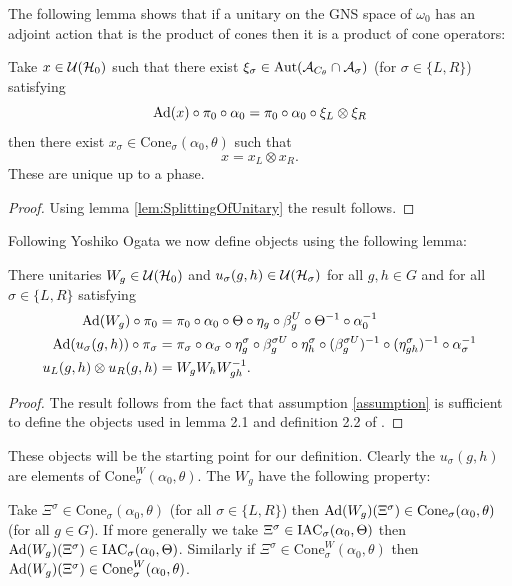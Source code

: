 \documentclass[12pt,a4paper,twoside]{article}
\numberwithin{equation}{section}
\begin{document}
The following lemma shows that if a unitary on the GNS space of $\omega_0$ has an adjoint action that is the product of cones then it is a product of cone operators:
\begin{lemma}\label{lem:UsingIrreducibilityAndWignerTheorem}
	Take $x\in\mathcal U(\mathcal H_0)$ such that there exist $\xi_\sigma\in\Aut{\AA_{C_\theta}\cap\AA_\sigma}$ (for $\sigma\in\{L,R\}$) satisfying
	\begin{equation}
		\Ad{x}\circ\pi_0\circ\alpha_0=\pi_0\circ\alpha_0\circ\xi_L\otimes\xi_R
	\end{equation}
	then there exist $x_\sigma\in\textrm{Cone}_\sigma(\alpha_0,\theta)$ such that
	\begin{equation}
		x=x_L\otimes x_R.
	\end{equation}
	These are unique up to a phase.
\end{lemma}
\begin{proof}
Using lemma \ref{lem:SplittingOfUnitary} the result follows.
\end{proof}
Following Yoshiko Ogata \cite{ogata2021h3gmathbb} we now define objects using the following lemma:
\begin{lemma}\label{lem:Definition_W_And_u}
	There unitaries $W_g\in\mathcal U(\mathcal H_0)$ and $u_{\sigma}(g,h)\in\mathcal U(\mathcal H_{\sigma})$ for all $g,h\in G$ and for all $\sigma\in\{L,R\}$ satisfying
	\begin{align}
		\Ad{W_g}\circ\pi_0&=\pi_0\circ\alpha_0\circ\Theta\circ\eta_g\circ\beta_g^U\circ\Theta^{-1}\circ\alpha_0^{-1}\\
		\Ad{u_\sigma(g,h)}\circ\pi_\sigma&=\pi_\sigma\circ\alpha_\sigma\circ\eta_g^\sigma\circ\beta_g^{\sigma U}\circ\eta_h^{\sigma}\circ(\beta_g^{\sigma U})^{-1}\circ(\eta^\sigma_{gh})^{-1}\circ\alpha_\sigma^{-1}\\
		u_L(g,h)\otimes u_R(g,h)&=W_gW_hW_{gh}^{-1}.
	\end{align}
\end{lemma}
\begin{proof}
	The result follows from the fact that assumption \ref{assumption} is sufficient to define the objects used in lemma 2.1 and definition 2.2 of \cite{ogata2021h3gmathbb}.
\end{proof}
These objects will be the starting point for our definition. Clearly the $u_\sigma(g,h)$ are elements of $\textrm{Cone}_\sigma^W(\alpha_0,\theta)$. The $W_g$ have the following property:
\begin{lemma}\label{lem:AdjointOverConeIsInCone}
	Take $\Xi^{\sigma}\in\textrm{Cone}_\sigma(\alpha_0,\theta)$ (for all $\sigma\in\{L,R\}$) then $\Ad{W_g}(\Xi^\sigma)\in\textrm{Cone}_\sigma(\alpha_0,\theta)$ (for all $g\in G$).	If more generally we take $\Xi^\sigma\in\textrm{IAC}_\sigma(\alpha_0,\Theta)$ then $\Ad{W_g}(\Xi^\sigma)\in\IAC_\sigma(\alpha_0,\Theta)$. Similarly if $\Xi^{\sigma}\in\textrm{Cone}_\sigma^W(\alpha_0,\theta)$ then $\Ad{W_g}(\Xi^\sigma)\in\textrm{Cone}_\sigma^W(\alpha_0,\theta)$.
\end{lemma}
\end{document}
